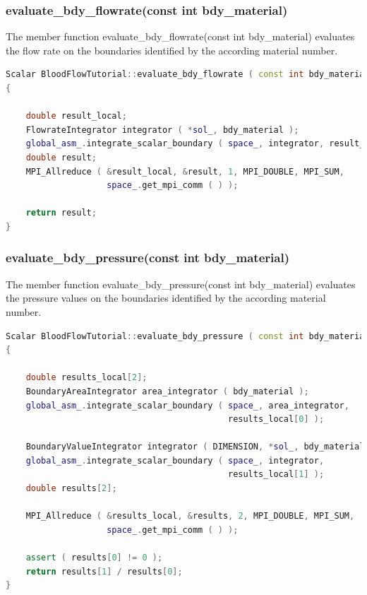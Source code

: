 \documentclass[a4paper, 11pt, twoside]{article}
\begin{document}
\subsubsection{evaluate\_bdy\_flowrate(const int bdy\_material)}
The member function evaluate\_bdy\_flowrate(const int bdy\_material) evaluates the flow rate on the boundaries identified by the according material number.

\begin{lstlisting}[language=C++, basicstyle={\footnotesize, \ttfamily}, keywordstyle=\color{blue},  numbers=none, tabsize=4]
Scalar BloodFlowTutorial::evaluate_bdy_flowrate ( const int bdy_material )
{

    double result_local;
    FlowrateIntegrator integrator ( *sol_, bdy_material );
    global_asm_.integrate_scalar_boundary ( space_, integrator, result_local );
    double result;
    MPI_Allreduce ( &result_local, &result, 1, MPI_DOUBLE, MPI_SUM,
    		        space_.get_mpi_comm ( ) );

    return result;
}

\end{lstlisting}

\subsubsection{evaluate\_bdy\_pressure(const int bdy\_material)}
The member function evaluate\_bdy\_pressure(const int bdy\_material) evaluates the pressure values on the boundaries identified by the according material number.

\begin{lstlisting}[language=C++, basicstyle={\footnotesize, \ttfamily}, keywordstyle=\color{blue},  numbers=none, tabsize=4]
Scalar BloodFlowTutorial::evaluate_bdy_pressure ( const int bdy_material )
{

    double results_local[2];
    BoundaryAreaIntegrator area_integrator ( bdy_material );
    global_asm_.integrate_scalar_boundary ( space_, area_integrator, 
    									    results_local[0] );

    BoundaryValueIntegrator integrator ( DIMENSION, *sol_, bdy_material );
    global_asm_.integrate_scalar_boundary ( space_, integrator,
    								        results_local[1] );
    double results[2];

    MPI_Allreduce ( &results_local, &results, 2, MPI_DOUBLE, MPI_SUM,
    		        space_.get_mpi_comm ( ) );

    assert ( results[0] != 0 );
    return results[1] / results[0];
}
\end{lstlisting}
\end{document}
